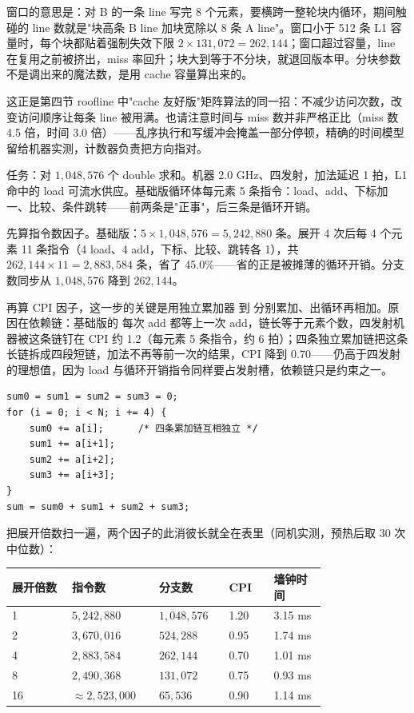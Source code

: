 窗口的意思是：对 B 的一条 line 写完 8 个元素，要横跨一整轮块内循环，期间触碰的 line 数就是"块高条 B line 加块宽除以 8 条 A line"。窗口小于 512 条 L1 容量时，每个块都贴着强制失效下限 $2\times131{,}072=262{,}144$；窗口超过容量，line 在复用之前被挤出，miss 率回升；块大到等于不分块，就退回版本甲。分块参数不是调出来的魔法数，是用 cache 容量算出来的。

这正是第四节 roofline 中"cache 友好版"矩阵算法的同一招：不减少访问次数，改变访问顺序让每条 line 被用满。也请注意时间与 miss 数并非严格正比（miss 数 4.5 倍，时间 3.0 倍）——乱序执行和写缓冲会掩盖一部分停顿，精确的时间模型留给机器实测，计数器负责把方向指对。

任务：对 $1{,}048{,}576$ 个 double 求和。机器 2.0 GHz、四发射，加法延迟 1 拍，L1 命中的 load 可流水供应。基础版循环体每元素 5 条指令：load、add、下标加一、比较、条件跳转——前两条是"正事"，后三条是循环开销。

先算指令数因子。基础版：$5\times1{,}048{,}576=5{,}242{,}880$ 条。展开 4 次后每 4 个元素 11 条指令（4 load、4 add，下标、比较、跳转各 1），共 $262{,}144\times11=2{,}883{,}584$ 条，省了 45.0\%——省的正是被摊薄的循环开销。分支数同步从 $1{,}048{,}576$ 降到 $262{,}144$。

再算 CPI 因子，这一步的关键是用独立累加器  到  分别累加、出循环再相加。原因在依赖链：基础版的  每次 add 都等上一次 add，链长等于元素个数，四发射机器被这条链钉在 CPI 约 1.2（每元素 5 条指令，约 6 拍）；四条独立累加链把这条长链拆成四段短链，加法不再等前一次的结果，CPI 降到 0.70——仍高于四发射的理想值，因为 load 与循环开销指令同样要占发射槽，依赖链只是约束之一。

\begin{lstlisting}
sum0 = sum1 = sum2 = sum3 = 0;
for (i = 0; i < N; i += 4) {
    sum0 += a[i];      /* 四条累加链互相独立 */
    sum1 += a[i+1];
    sum2 += a[i+2];
    sum3 += a[i+3];
}
sum = sum0 + sum1 + sum2 + sum3;
\end{lstlisting}

把展开倍数扫一遍，两个因子的此消彼长就全在表里（同机实测，预热后取 30 次中位数）：

\begin{longtable}{L{0.16\linewidth}L{0.20\linewidth}L{0.16\linewidth}L{0.12\linewidth}L{0.14\linewidth}}
\toprule
展开倍数 & 指令数 & 分支数 & CPI & 墙钟时间 \\
 & $5{,}242{,}880$ & $1{,}048{,}576$ & 1.20 & 3.15 ms \\
2 & $3{,}670{,}016$ & $524{,}288$ & 0.95 & 1.74 ms \\
4 & $2{,}883{,}584$ & $262{,}144$ & 0.70 & 1.01 ms \\
8 & $2{,}490{,}368$ & $131{,}072$ & 0.75 & 0.93 ms \\
16 & $\approx2{,}523{,}000$ & $65{,}536$ & 0.90 & 1.14 ms \\
\bottomrule
\end{longtable}

